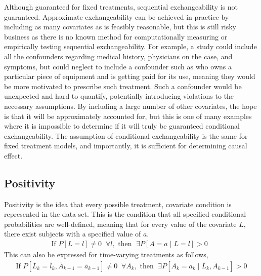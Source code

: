 Although guaranteed for fixed treatments, sequential exchangeability is not guaranteed.\cite{wright2015international}  Approximate exchangeability can be achieved in practice by including as many covariates as is feasibly reasonable, but this is still risky business as there is no known method for computationally measuring or empirically testing sequential exchangeability.  For example, a study could include all the confounders regarding medical history, physicians on the case, and symptoms, but could neglect to include a confounder such as who owns a particular piece of equipment and is getting paid for its use, meaning they would be more motivated to prescribe such treatment.  Such a confounder would be unexpected and hard to quantify, potentially introducing violations to the necessary assumptions.  By including a large number of other covariates, the hope is that it will be approximately accounted for, but this is one of many examples where it is impossible to determine if it will truly be guaranteed conditional exchangeability.  The assumption of conditional exchangeability is the same for fixed treatment models, and importantly, it is sufficient for determining causal effect. 

      
\subsection{Positivity} 
Positivity is the idea that every possible treatment, covariate condition is represented in the data set.  This is the condition that all specified conditional probabilities are well-defined, meaning that for every value of the covariate $L$, there exist subjects with a specified value of $a$.\cite{hernan2006estimating} 
\begin{align}
\text{If }P[L=l] \neq 0 \; \; \forall l, \text{ then } \;  \exists P[A=a \mid L=l] > 0 \;\;  
\end{align} 
This can also be expressed for time-varying treatments as follows, 
\begin{align} 
\text{If } P[\overline{L}_k = \overline{l}_k, \overline{A}_{k-1} = \overline{a}_{k-1} ] \neq 0 \; \; \forall A_k, \text{ then }  \; \exists P[A_k = a_k \mid \overline{L}_{k}, \overline{A}_{k-1}] > 0 
\end{align} 




